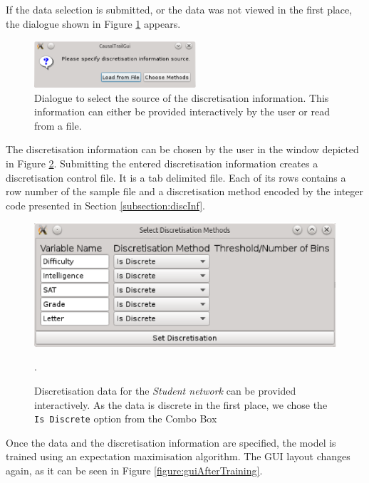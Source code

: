 \noindent
If the data selection is submitted, or the data was not viewed in the first place, the dialogue shown in Figure \ref{figure:dialogDiscretisation} appears.
\begin{figure}[H]
 \begin{center}
 \includegraphics[width=6cm]{pic/discretisationSelection.eps}
 \caption{Dialogue to select the source of the discretisation information. This information can either be provided interactively by the user or read from a file.}
 \label{figure:dialogDiscretisation}
 \end{center}
\end{figure}
\noindent
The discretisation information can be chosen by the user in the window depicted in Figure \ref{figure:chooseDiscInf}. Submitting the entered discretisation information
creates a discretisation control file. It is a tab delimited file. Each of its rows contains a row number of the sample file and a discretisation method encoded by the integer code presented in Section \ref{subsection:discInf}.
\begin{figure}[H]
 \begin{center}
  \includegraphics[width=\textwidth]{pic/discretisationInteractive.eps}
  \caption{Discretisation data for the \textit{Student network} can be provided interactively. As the data is discrete in the first place, we chose the \texttt{Is Discrete} option from the Combo Box}.
  \label{figure:chooseDiscInf}
 \end{center}
\end{figure}
\noindent
Once the data and the discretisation information are specified, the model is trained using an expectation maximisation algorithm. The GUI layout changes again, as it can be seen in Figure \ref{figure:guiAfterTraining}.
